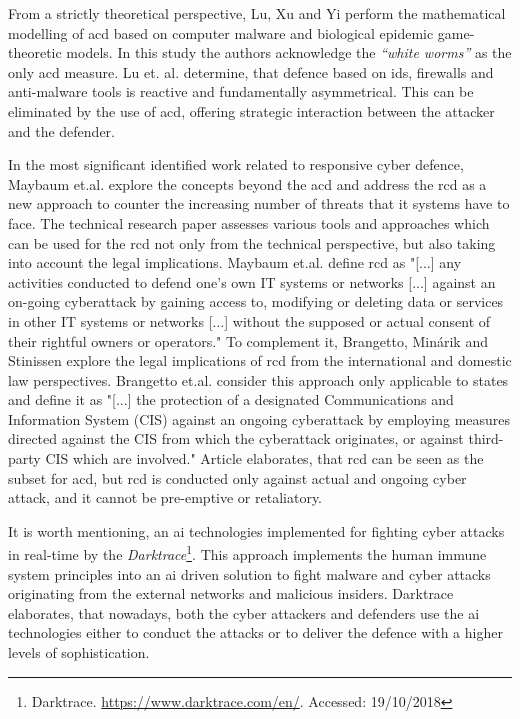 From a strictly theoretical perspective, Lu, Xu and Yi \cite{Lu2013} perform the mathematical modelling of \gls{acd} based on computer malware and biological epidemic game-theoretic models. In this study the authors acknowledge the \textit{``white worms''} as the only \gls{acd} measure. Lu et. al. determine, that defence based on \gls{ids}, firewalls and anti-malware tools is reactive and fundamentally asymmetrical. This can be eliminated by the use of \gls{acd}, offering strategic interaction between the attacker and the defender.

In the most significant identified work related to responsive cyber defence, Maybaum et.al. \cite{Maybaum2014} explore the concepts beyond the \gls{acd} and address the \gls{rcd} as a new approach to counter the increasing number of threats that \gls{it} systems have to face. The technical research paper assesses various tools and approaches which can be used for the \gls{rcd} not only from the technical perspective, but also taking into account the legal implications. Maybaum et.al. define \gls{rcd} as "[...] any activities conducted to defend one’s own IT systems or networks [...] against an on-going cyberattack by gaining access to, modifying or deleting data or services in other IT systems or networks [...] without the supposed or actual consent of their rightful owners or operators."
To complement it, Brangetto, Min\'{a}rik and Stinissen \cite{Brangetto2014-2} explore the legal implications of \gls{rcd} from the international and domestic law perspectives. Brangetto et.al. consider this approach only applicable to states and define it as "[...] the protection of a designated Communications and Information System (CIS) against an ongoing cyberattack by employing measures directed against the CIS from which the cyberattack originates, or against third-party CIS which are involved." Article elaborates, that \gls{rcd} can be seen as the subset for \gls{acd}, but \gls{rcd} is conducted only against actual and ongoing cyber attack, and it cannot be pre-emptive or retaliatory.

It is worth mentioning, an \gls{ai} technologies implemented for fighting cyber attacks in real-time by the \textit{Darktrace}\footnote{Darktrace. \url{https://www.darktrace.com/en/}. Accessed: 19/10/2018}. This approach implements the human immune system principles into an \gls{ai} driven solution to fight malware and cyber attacks originating from the external networks and malicious insiders. Darktrace elaborates, that nowadays, both the cyber attackers and defenders use the \gls{ai} technologies either to conduct the attacks or to deliver the defence with a higher levels of sophistication.


